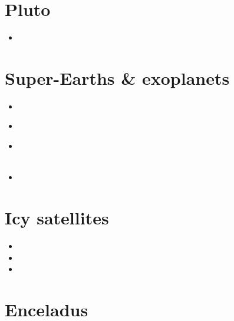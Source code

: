 \section{Pluto}

\begin{scriptsize}
\begin{itemize}
\item[\twothousandsixteen] 
\end{itemize}
\end{scriptsize}

\section{Super-Earths \& exoplanets}

\begin{scriptsize}
\begin{itemize}
\item[\twothousandeleven]
  \\
\item[\twothousandthirteen]
\item[\twothousandfifteen] 
  \\
  \\
\item[\twothousandtwentythree] 
\end{itemize}
\end{scriptsize}

\section{Icy satellites}

\begin{scriptsize}
\begin{itemize}
\item[\twothousandtwelve] 
\item[\twothousandnineteen] 
\item[\twothousandtwentytwo] 
\end{itemize}
\end{scriptsize}

\section{Enceladus}

